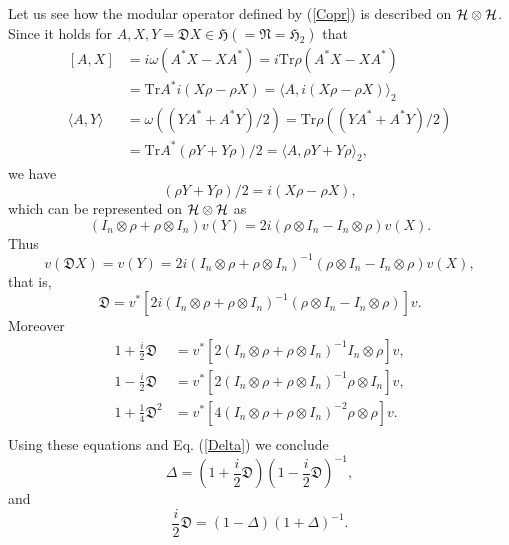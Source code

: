 \documentclass{article}
\begin{document}
Let us see how the modular operator defined by  (\ref{Copr}) is described on $\cal{H}\otimes \cal{H}$.
Since it holds for $A,X,Y=\mathfrak{D}X\in \mathfrak{H}(=\mathfrak{N}=\mathfrak{H}_2)$
that 
 \begin{equation}
 \begin{split}
 [A,X]&=i\omega(A^\ast X-XA^\ast)=i\mbox{Tr}\rho(A^\ast X-XA^\ast)\\
      &=\mbox{Tr}A^\ast i(X\rho-\rho X)=\langle A, i(X\rho-\rho X)\rangle_2\\
 \langle A,Y\rangle&=\omega((YA^\ast+A^\ast Y)/2)=\mbox{Tr}\rho((YA^\ast+A^\ast Y)/2)\\
 &=\mbox{Tr}A^\ast(\rho Y+Y\rho)/2=\langle A, \rho Y+Y\rho \rangle_2,
 \end{split}
 \end{equation}
  we have
 $$
 (\rho Y+Y\rho)/2=i(X\rho-\rho X),
 $$
 which can be represented on $\cal{H}\otimes \cal{H}$ as
	$$
	(I_n\otimes \rho + \rho\otimes I_n)v(Y)=2i(\rho\otimes I_n -I_n\otimes \rho )v(X).
	$$
	Thus 
	$$
	v(\mathfrak{D}X)=v(Y)=2i(I_n\otimes \rho + \rho\otimes I_n)^{-1}(\rho\otimes I_n -I_n\otimes \rho )v(X),
	$$
	that is,
	$$
	\mathfrak{D}=v^\ast[ 2i(I_n\otimes \rho + \rho\otimes I_n)^{-1}(\rho\otimes I_n -I_n\otimes \rho )]v.
	$$
	  Moreover
	\begin{equation}  
		\begin{split}
    1+\frac{i}{2}\mathfrak{D}&=v^\ast [ 2(I_n\otimes \rho+\rho\otimes I_n)^{-1}  I_n\otimes \rho]v,\\
    1-\frac{i}{2}\mathfrak{D}&=v^\ast [ 2(I_n\otimes \rho+\rho\otimes I_n)^{-1}\rho \otimes I_n]v,\\
    1+\frac{1}{4}\mathfrak{D}^2&=v^\ast[ 4(I_n\otimes \rho+\rho\otimes I_n)^{-2}\rho \otimes \rho]v.\\
    \end{split}
	\end{equation}
Using these equations and Eq. (\ref{Delta})  we conclude
		$$
    \Delta=\left(1+\frac{i}{2}\mathfrak{D}\right)\left(1-\frac{i}{2}\mathfrak{D}\right)^{-1},
		$$
		and
		$$
     \frac{i}{2}\mathfrak{D}=(1-\Delta)(1+\Delta)^{-1}.
		$$
\end{document}
